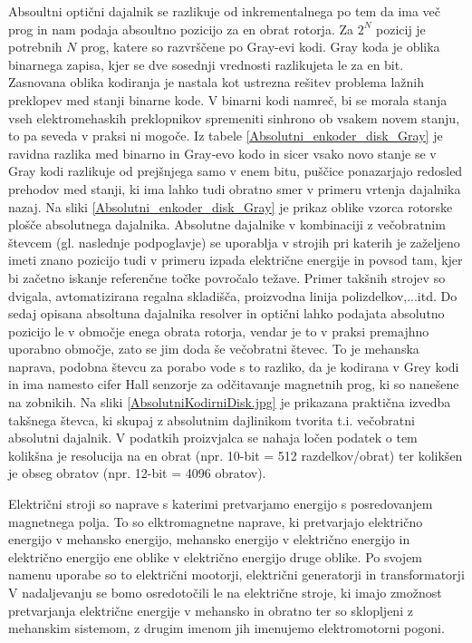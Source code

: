 \documentclass[a4paper,twoside,openright,12pt]{book}
\begin{document}
Absoultni optični dajalnik se razlikuje od inkrementalnega po tem da ima več prog in nam podaja absoultno pozicijo za en obrat rotorja. Za $2^N$ pozicij je potrebnih $N$ prog, katere so razvrščene po Gray-evi kodi. Gray koda je oblika binarnega zapisa, kjer se dve sosednji vrednosti razlikujeta le za en bit. Zasnovana oblika kodiranja je nastala kot ustrezna rešitev problema lažnih preklopev med stanji binarne kode. V binarni kodi namreč, bi se morala stanja vseh elektromehaskih preklopnikov spremeniti sinhrono ob vsakem novem stanju, to pa seveda v praksi ni mogoče. Iz tabele \ref{Absolutni_enkoder_disk_Gray} je ravidna razlika med binarno in Gray-evo kodo in sicer vsako novo stanje se v Gray kodi razlikuje od prejšnjega samo v enem bitu, puščice ponazarjajo redosled prehodov med stanji, ki ima lahko tudi obratno smer v primeru vrtenja dajalnika nazaj. Na sliki \ref{Absolutni_enkoder_disk_Gray} je prikaz oblike vzorca rotorske plošče absolutnega dajalnika. Absolutne dajalnike v kombinaciji z večobratnim števcem (gl. naslednje podpoglavje) se uporablja v strojih pri katerih je zaželjeno imeti znano pozicijo tudi v primeru izpada električne energije in povsod tam, kjer bi začetno iskanje referenčne točke povročalo težave. Primer takšnih strojev so dvigala, avtomatizirana regalna skladišča, proizvodna linija polizdelkov,...itd.
Do sedaj opisana absoltuna dajalnika resolver in optični lahko podajata absolutno pozicijo le v območje enega obrata rotorja, vendar je to v praksi premajhno uporabno območje, zato se jim doda še večobratni števec. To je mehanska naprava, podobna števcu za porabo vode s to razliko, da je kodirana v Grey kodi in ima namesto cifer Hall senzorje za odčitavanje magnetnih prog, ki so nanešene na zobnikih. Na sliki \ref{AbsolutniKodirniDisk.jpg} je prikazana praktična izvedba takšnega števca, ki skupaj z absolutnim dajlinikom tvorita t.i. večobratni absolutni dajalnik. V podatkih proizvjalca \cite{temperature3sendix} se nahaja ločen podatek o tem kolikšna je resolucija na en obrat (npr. 10-bit = 512 razdelkov/obrat) ter kolikšen je obseg obratov (npr. 12-bit = 4096 obratov).

Električni stroji so naprave s katerimi pretvarjamo energijo s posredovanjem magnetnega polja. To so elktromagnetne naprave, ki pretvarjajo električno energijo v mehansko energijo, mehansko energijo v električno energijo in električno energijo ene oblike v električno energijo druge oblike. Po svojem namenu uporabe so to električni mootorji, električni generatorji in transformatorji \cite{miljavec2009vezna} V nadaljevanju se bomo osredotočili le na električne stroje, ki imajo zmožnost pretvarjanja električne energije v mehansko in obratno ter so sklopljeni z mehanskim sistemom, z drugim imenom jih imenujemo elektromotorni pogoni.\\  
\end{document}
